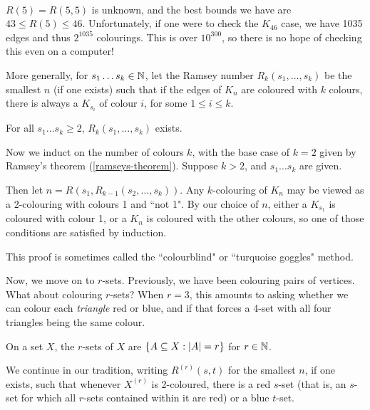 \documentclass{article}
\begin{document}
\

$R(5) = R(5, 5)$ is unknown, and the best bounds we have are $43 \leq R(5) \leq 46$. Unfortunately, if one were to check the $K_{46}$ case, we have 1035 edges and thus $2^{1035}$ colourings. This is over $10^{300}$, so there is no hope of checking this even on a computer!

\begin{definition}
    More generally, for $s_1 \dots s_k \in \mathbb{N}$, let the Ramsey number $R_k(s_1, \dots, s_k)$ be the smallest $n$ (if one exists) such that if the edges of $K_n$ are coloured with $k$ colours, there is always a $K_{s_i}$ of colour $i$, for some $1 \leq i \leq k$.
\end{definition}

\begin{proposition}
    For all $s_1 \dots s_k \geq 2$, $R_k(s_1, \dots, s_k)$ exists. 
\end{proposition}

\begin{prf}
    Now we induct on the number of colours $k$, with the base case of $k = 2$ given by Ramsey's theorem (\ref{ramseys-theorem}). Suppose $k > 2$, and $s_1 \dots s_k$ are given.
    
    Then let $n = R(s_1, R_{k-1}(s_2, \dots, s_k))$. Any $k$-colouring of $K_n$ may be viewed as a 2-colouring with colours 1 and ``not 1". By our choice of $n$, either a $K_{s_1}$ is coloured with colour 1, or a $K_{n}$ is coloured with the other colours, so one of those conditions are satisfied by induction.
\end{prf}

\begin{note}
	This proof is sometimes called the ``colourblind" or ``turquoise goggles" method.
\end{note}

Now, we move on to $r$-sets. Previously, we have been colouring pairs of vertices. What about colouring $r$-sets? When $r=3$, this amounts to asking whether we can colour each \textit{triangle} red or blue, and if that forces a 4-set with all four triangles being the same colour.

\begin{definition}[$r$-set]
    On a set $X$, the $r$-sets of $X$ are $\left\lbrace A \subseteq X: \left\lvert A \right\rvert = r \right\rbrace$ for $r \in \mathbb{N}$.
\end{definition}

We continue in our tradition, writing $R^{(r)}(s, t)$ for the smallest $n$, if one exists, such that whenever $X^{(r)}$ is 2-coloured, there is a red $s$-set (that is, an $s$-set for which all $r$-sets contained within it are red) or a blue $t$-set.
\end{document}
